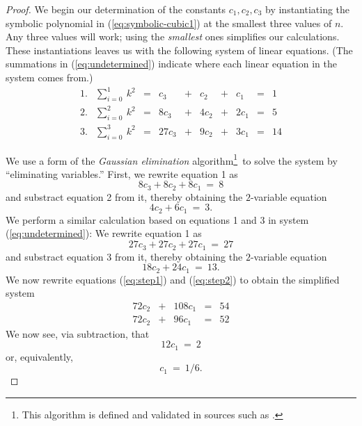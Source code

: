 {\begin{proof}
We begin our determination of the constants $c_1, c_2, c_3$ by
instantiating the symbolic polynomial in (\ref{eq:symbolic-cubic1}) at
the smallest three values of $n$.  Any three values will work; using
the {\em smallest} ones simplifies our calculations.  These
instantiations leaves us with the following system of linear
equations.  (The summations in (\ref{eq:undetermined}) indicate where
each linear equation in the system comes from.)
\begin{equation}
\label{eq:undetermined}
\begin{array}{lccccccccc}
1. &
{\displaystyle \sum_{i=0}^1 \ k^2}
   & = & c_3    & + & c_2   & + & c_1   & = & 1 \\
2. &
{\displaystyle \sum_{i=0}^2 \ k^2}
   & = & 8 c_3  & + & 4 c_2 & + & 2 c_1 & = & 5 \\
3. &
{\displaystyle \sum_{i=0}^3 \ k^2}
   & = & 27 c_3 & + & 9 c_2 & + & 3 c_1 & = & 14
\end{array}
\end{equation}

We use a form of the {\it Gaussian elimination}
algorithm\footnote{This algorithm is defined and validated in sources
  such as \cite{CLRS}.}~to solve the system by ``eliminating
variables.''  First, we rewrite equation 1 as
\[ 8 c_3 + 8 c_2 + 8 c_1 \ = \ 8 \]
and substract equation 2 from it, thereby obtaining the $2$-variable
equation
\begin{equation}
\label{eq:step1}
4c_2 + 6 c_1 \ = \ 3.
\end{equation}
We perform a similar calculation based on equations 1 and 3 in
system (\ref{eq:undetermined}):  We rewrite equation 1 as
\[ 27 c_3 + 27 c_2 + 27 c_1 \ = \ 27 \]
and substract equation 3 from it, thereby obtaining the $2$-variable
equation
\begin{equation}
\label{eq:step2}
18 c_2 + 24 c_1 \ = \ 13.
\end{equation}
We now rewrite equations (\ref{eq:step1}) and (\ref{eq:step2}) to
obtain the simplified system
\[
\begin{array}{ccccc}
72 c_2 & + & 108 c_1 & = & 54 \\
72 c_2 & + &  96 c_1 & = & 52
\end{array}
\]
We now see, via subtraction, that
\[ 12 c_1 \ = \ 2 \]
or, equivalently,
\begin{equation}
\label{eq:valueof-c1}
c_1 \ = \ 1/6.
\end{equation}


\end{proof}}
